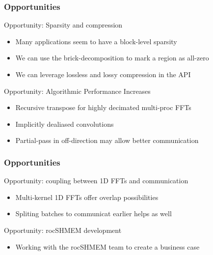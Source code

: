 \documentclass[10pt,aspectratio=169]{beamer}
\begin{document}
\begin{frame}
  \frametitle{Opportunities}
  
  \begin{center}
    Opportunity: Sparsity and compression
  \end{center}
  \begin{itemize}
  \item Many applications seem to have a block-level sparsity
  \item We can use the brick-decomposition to mark a region as all-zero
  \item We can leverage lossless and lossy compression in the API
  \end{itemize}

  \medskip
  \begin{center}
    Opportunity: Algorithmic Performance Increases
  \end{center}
  \begin{itemize}
  \item Recursive transpose for highly decimated multi-proc FFTs
  \item Implicitly dealiased convolutions
  \item Partial-pass in off-direction may allow better communication
  \end{itemize}

 
\end{frame}
  
\begin{frame}
  \frametitle{Opportunities}

  \begin{center}
    Opportunity: coupling between 1D FFTs and communication
  \end{center}
  \begin{itemize}
  \item Multi-kernel 1D FFTs offer overlap possibilities
  \item Spliting batches to communicat earlier helps as well   
  \end{itemize}

  
  \medskip
  \begin{center}
    Opportunity: rocSHMEM development
  \end{center}
  \begin{itemize}
  \item Working with the rocSHMEM team to create a business case
  \end{itemize}

\end{frame}
\end{document}
